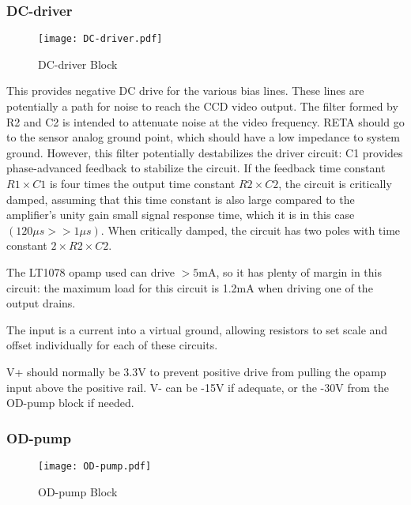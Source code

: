 \documentclass[a4paper,12pt]{article}
\begin{document}
\subsubsection{DC-driver}
   \begin{figure}
   \begin{center}
   \texttt{[image: DC-driver.pdf]}
   \end{center}
   \caption{DC-driver Block}
   \end{figure}

This provides negative DC drive for the various bias lines. These lines are potentially a path for noise to reach the CCD video output. The filter formed by R2 and C2 is intended to attenuate noise at the video frequency. RETA should go to the sensor analog ground point, which should have a low impedance to system ground.
However, this filter potentially destabilizes the driver circuit: C1 provides phase-advanced feedback to stabilize the circuit. If the feedback time constant $R1\times C1$ is four times the output time constant $R2\times C2$, the circuit is critically damped, assuming that this time constant is also large compared to the amplifier's unity gain small signal response time, which it is in this case $(120\mu s>>1 \mu s)$. When critically damped, the circuit has two poles with time constant $2\times R2\times C2$.

The LT1078 opamp used can drive $>5$mA, so it has plenty of margin in this circuit: the maximum load for this circuit is 1.2mA when driving one of the output drains. 

The input is a current into a virtual ground, allowing resistors to set scale and offset individually for each of these circuits.

V+ should normally be 3.3V to prevent positive drive from pulling the opamp input above the positive rail. V- can be -15V if adequate, or the -30V from the OD-pump block if needed.



\subsubsection{OD-pump}

   \begin{figure}
   \begin{center}
   \texttt{[image: OD-pump.pdf]}
   \end{center}
   \caption{OD-pump Block}
   \end{figure}
   
\end{document}
